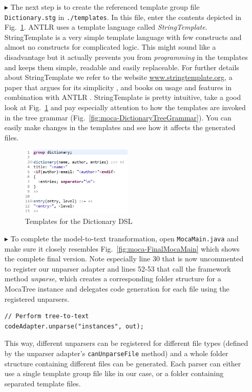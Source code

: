 \begin{enumerate}
\item[$\blacktriangleright$] The next step is to create the referenced template group file \texttt{Dic\-tion\-ary.stg} in \texttt{./templates}.
In this file, enter the contents depicted in Fig.~\ref{fig:moca-DictionaryTemplates}.    
ANTLR uses a template language called \emph{StringTemplate}.
StringTemplate is a very simple template language with few constructs and almost no constructs for complicated logic.
This might sound like a disadvantage but it actually prevents you from \emph{programming} in the templates and keeps them simple, readable and easily replaceable.
For further details about StringTemplate we refer to the website \url{www.stringtemplate.org}, a paper that argues for its simplicity \cite{PAR04}, and books on usage and features in combination with ANTLR \cite{ANTLR, LangImplPatterns}.
StringTemplate is pretty intuitive, take a good look at Fig.~\ref{fig:moca-DictionaryTemplates} and pay especially attention to how the templates are invoked in the tree grammar (Fig.~\ref{fig:moca-DictionaryTreeGrammar}).
You can easily make changes in the templates and see how it affects the generated files.
\begin{figure}[!htbp]
\begin{center}
 \includegraphics[width=0.5\textwidth]{pics/moca/5MocaTreeToText/DictionaryTemplates}
  \caption{Templates for the Dictionary DSL} 
  \label{fig:moca-DictionaryTemplates}
\end{center}
\end{figure} 

\item[$\blacktriangleright$] To complete the model-to-text transformation, open \texttt{MocaMain.java} and make sure it closely resembles Fig.~\ref{fig:moca-FinalMocaMain} which shows the complete final version.
Note especially line 30 that is now uncommented to register our unparser adapter and lines 52-53 that call the framework method \emph{unparse}, which creates a corresponding folder structure for a MocaTree instance and delegates code generation for each file using the registered unparsers.
\begin{verbatim}
// Perform tree-to-text
codeAdapter.unparse("instances", out);
\end{verbatim}
This way, different unparsers can be registered for different file types (defined by the unparser adapter's \texttt{canUnparseFile} method) and a whole folder structure containing different files can be generated.
Each parser can either use a single template group file like in our case, or a folder containing separated template files.


\end{enumerate}
